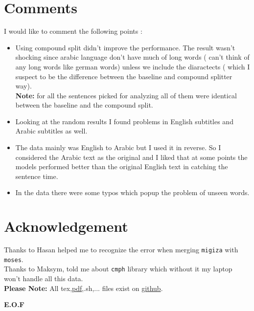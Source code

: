 \documentclass{article}
\begin{document}
\section{Comments}
I would like to comment the following points :
\begin{itemize}
\item Using compound split didn't improve the performance. The result wasn't shocking since arabic language don't have much of long words ( can't think of any long words like german words) unless we include the diaractects ( which I suspect to be the difference between the baseline and compound splitter way).\\
\textbf{Note:} for all the sentences picked for analyzing all of them were identical between the baseline and the compound split.
\item Looking at the random results I found problems in English subtitles and Arabic subtitles as well.
\item The data mainly was English to Arabic but I used it in reverse. So I considered the Arabic text as the original and I liked that at some points the models performed better than the original English text in catching the sentence time.
\item In the data there were some typos which popup the problem of unseen words.
\end{itemize}
\section{Acknowledgement}
Thanks to Hasan helped me to recognize the error when merging \texttt{migiza} with \texttt{moses}.\\
Thanks to Maksym, told me about \texttt{cmph} library which without it my laptop won't handle all this data.\\
\textbf{Please Note:} All tex,\href{https://github.com/aqeel13932/MT/blob/master/03PreProcessing/Report/report.pdf}{pdf},.sh,... files exist on \href{https://github.com/aqeel13932/MT/tree/master/03PreProcessing}{github}. 

{\center \textbf{E.O.F\\}}
\end{document}
